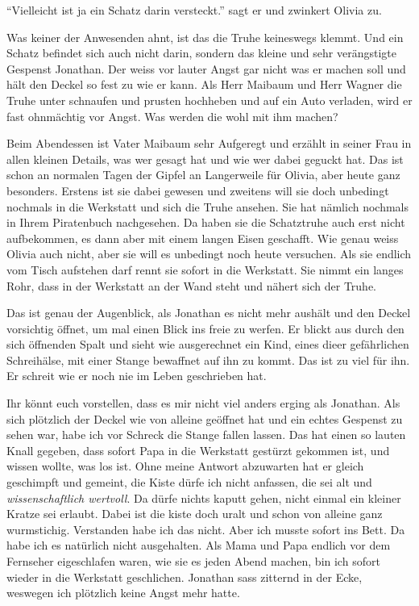 \enquote{Vielleicht ist ja ein Schatz darin versteckt.} sagt er und zwinkert Olivia zu. 

Was keiner der Anwesenden ahnt, ist das die Truhe keineswegs klemmt. Und ein Schatz befindet sich auch nicht darin, sondern das kleine und sehr verängstigte Gespenst Jonathan. Der weiss vor lauter Angst gar nicht was er machen soll und hält den Deckel so fest zu wie er kann. Als Herr Maibaum und Herr Wagner die Truhe unter schnaufen und prusten hochheben und auf ein Auto verladen, wird er fast ohnmächtig vor Angst. Was werden die wohl mit ihm machen?

Beim Abendessen ist Vater Maibaum sehr Aufgeregt und erzählt in seiner Frau in allen kleinen Details, was wer gesagt hat und wie wer dabei geguckt hat. Das ist schon an normalen Tagen der Gipfel an Langerweile für Olivia, aber heute ganz besonders. Erstens ist sie dabei gewesen und zweitens will sie doch unbedingt nochmals in die Werkstatt und sich die Truhe ansehen. Sie hat nämlich nochmals in Ihrem Piratenbuch nachgesehen. Da haben sie die Schatztruhe auch erst nicht aufbekommen, es dann aber mit einem langen Eisen geschafft. Wie genau weiss Olivia auch nicht, aber sie will es unbedingt noch heute versuchen. Als sie endlich vom Tisch aufstehen darf rennt sie sofort in die Werkstatt. Sie nimmt ein langes Rohr, dass in der Werkstatt an der Wand steht und nähert sich der Truhe.

Das ist genau der Augenblick, als Jonathan es nicht mehr aushält und den Deckel vorsichtig öffnet, um mal einen Blick ins freie zu werfen. Er blickt aus durch den sich öffnenden Spalt und sieht wie ausgerechnet ein Kind, eines dieer gefährlichen Schreihälse, mit einer Stange bewaffnet auf ihn zu kommt. Das ist zu viel für ihn. Er schreit wie er noch nie im Leben geschrieben hat.
\medskip
\begin{mdframed}[style=mystyle]
  Ihr könnt euch vorstellen, dass es mir nicht viel anders erging als Jonathan. Als sich plötzlich der Deckel wie von alleine geöffnet hat und ein echtes Gespenst zu sehen war, habe ich vor Schreck die Stange fallen lassen. Das hat einen so lauten Knall gegeben, dass sofort Papa in die Werkstatt gestürzt gekommen ist, und wissen wollte, was los ist. Ohne meine Antwort abzuwarten hat er gleich geschimpft und gemeint, die Kiste dürfe ich nicht anfassen, die sei alt und \textit{wissenschaftlich wertvoll}. Da dürfe nichts kaputt gehen, nicht einmal ein kleiner Kratze sei erlaubt. Dabei ist die kiste doch uralt und schon von alleine ganz wurmstichig. Verstanden habe ich das nicht. Aber ich musste sofort ins Bett. Da habe ich es natürlich nicht ausgehalten. Als Mama und Papa endlich vor dem Fernseher eigeschlafen waren, wie sie es jeden Abend machen, bin ich sofort wieder in die Werkstatt geschlichen. Jonathan sass zitternd in der Ecke, weswegen ich plötzlich keine Angst mehr hatte. 
\end{mdframed}\medskip


